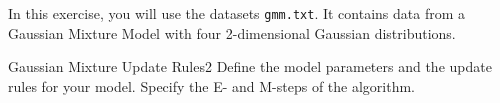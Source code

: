 \newif\ifvimbug
\vimbugfalse

\ifvimbug

\fi

 
In this exercise, you will use the datasets \texttt{gmm.txt}. It contains data from a Gaussian Mixture Model with four 2-dimensional Gaussian distributions.

\begin{questions}


\begin{question}{Gaussian Mixture Update Rules}{2}
Define the model parameters and the update rules for your model. 
Specify the E- and M-steps of the algorithm.

\begin{answer}\end{answer}

\end{question}



\end{questions}
